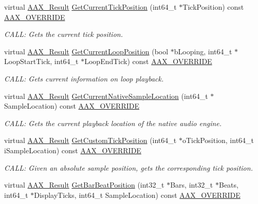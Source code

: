 \begin{DoxyCompactItemize}
virtual \hyperlink{a00149_a4d8f69a697df7f70c3a8e9b8ee130d2f}{A\+A\+X\+\_\+\+Result} \hyperlink{a00141_aa11696cca808c609e1782b8faf06ec98}{Get\+Current\+Tick\+Position} (int64\+\_\+t $\ast$Tick\+Position) const \hyperlink{a00149_ac2f24a5172689ae684344abdcce55463}{A\+A\+X\+\_\+\+O\+V\+E\+R\+R\+I\+D\+E}
\begin{DoxyCompactList}\small\item\em C\+A\+L\+L\+: Gets the current tick position. \end{DoxyCompactList}\item 
virtual \hyperlink{a00149_a4d8f69a697df7f70c3a8e9b8ee130d2f}{A\+A\+X\+\_\+\+Result} \hyperlink{a00141_aa1848e5cdd916171b6f1b5f4346356e1}{Get\+Current\+Loop\+Position} (bool $\ast$b\+Looping, int64\+\_\+t $\ast$Loop\+Start\+Tick, int64\+\_\+t $\ast$Loop\+End\+Tick) const \hyperlink{a00149_ac2f24a5172689ae684344abdcce55463}{A\+A\+X\+\_\+\+O\+V\+E\+R\+R\+I\+D\+E}
\begin{DoxyCompactList}\small\item\em C\+A\+L\+L\+: Gets current information on loop playback. \end{DoxyCompactList}\item 
virtual \hyperlink{a00149_a4d8f69a697df7f70c3a8e9b8ee130d2f}{A\+A\+X\+\_\+\+Result} \hyperlink{a00141_aa93ac25f5c80e310bbadbdf6ea2877f0}{Get\+Current\+Native\+Sample\+Location} (int64\+\_\+t $\ast$Sample\+Location) const \hyperlink{a00149_ac2f24a5172689ae684344abdcce55463}{A\+A\+X\+\_\+\+O\+V\+E\+R\+R\+I\+D\+E}
\begin{DoxyCompactList}\small\item\em C\+A\+L\+L\+: Gets the current playback location of the native audio engine. \end{DoxyCompactList}\item 
virtual \hyperlink{a00149_a4d8f69a697df7f70c3a8e9b8ee130d2f}{A\+A\+X\+\_\+\+Result} \hyperlink{a00141_aa811b001215e8942cf7baa3885eecac2}{Get\+Custom\+Tick\+Position} (int64\+\_\+t $\ast$o\+Tick\+Position, int64\+\_\+t i\+Sample\+Location) const \hyperlink{a00149_ac2f24a5172689ae684344abdcce55463}{A\+A\+X\+\_\+\+O\+V\+E\+R\+R\+I\+D\+E}
\begin{DoxyCompactList}\small\item\em C\+A\+L\+L\+: Given an absolute sample position, gets the corresponding tick position. \end{DoxyCompactList}\item 
virtual \hyperlink{a00149_a4d8f69a697df7f70c3a8e9b8ee130d2f}{A\+A\+X\+\_\+\+Result} \hyperlink{a00141_a06e77799439e692e594e291385073b30}{Get\+Bar\+Beat\+Position} (int32\+\_\+t $\ast$Bars, int32\+\_\+t $\ast$Beats, int64\+\_\+t $\ast$Display\+Ticks, int64\+\_\+t Sample\+Location) const \hyperlink{a00149_ac2f24a5172689ae684344abdcce55463}{A\+A\+X\+\_\+\+O\+V\+E\+R\+R\+I\+D\+E}

\end{DoxyCompactItemize}
